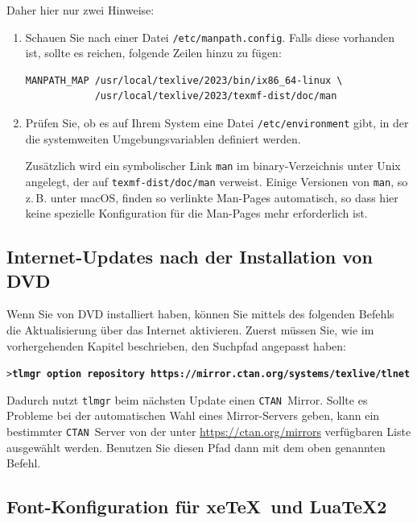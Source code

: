 \documentclass[12pt,ngerman,a4paper,fullparskip]{report}
\newcommand{\acro}[1]{\texttt{#1}}
\newcommand{\cmdname}[1]{\texttt{#1}}
\newcommand{\code}[1]{\texttt{#1}}
\newcommand{\filename}[1]{\texttt{#1}}
\newcommand{\dirname}[1]{\texttt{#1}}
\newcommand{\Ucom}[1]{\textbf{\texttt{#1}}}
\providecommand*{\CTAN}{\acro{CTAN}\xspace}
\providecommand*{\macOS}{macOS\xspace}
\begin{document}
Daher hier nur zwei Hinweise: 

\begin{enumerate}
\item Schauen Sie nach einer Datei
\filename{/etc/manpath.config}. Falls diese vorhanden ist, sollte es reichen, folgende Zeilen
hinzu zu fügen:

\begin{verbatim}
MANPATH_MAP /usr/local/texlive/2023/bin/ix86_64-linux \
            /usr/local/texlive/2023/texmf-dist/doc/man
\end{verbatim}

\item Prüfen Sie, ob es auf Ihrem System eine Datei \filename{/etc/environment} gibt, in der die
systemweiten Umgebungsvariablen definiert werden.

Zusätzlich wird ein symbolischer Link \code{man} im binary-Verzeichnis unter
Unix angelegt, der auf \dirname{texmf-dist/doc/man} verweist. Einige Versionen von \code{man}, so z.\,B. unter \macOS, finden so verlinkte Man-Pages automatisch, so dass hier keine spezielle
Konfiguration für die Man-Pages mehr erforderlich ist.

\end{enumerate}

\subsection{Internet-Updates nach der Installation von DVD}
\label{sec:dvd-install-net-updates}


Wenn Sie von DVD installiert haben, können Sie mittels des folgenden Befehls die Aktualisierung über das Internet aktivieren. Zuerst müssen Sie, wie im vorhergehenden Kapitel beschrieben, den Suchpfad angepasst haben:

\begin{alltt}
> \Ucom{tlmgr option repository https://mirror.ctan.org/systems/texlive/tlnet}
\end{alltt}

\noindent Dadurch nutzt \cmdname{tlmgr} beim nächsten Update einen \CTAN\ Mirror. Sollte es Probleme bei der automatischen Wahl eines Mirror-Servers geben, kann ein bestimmter \CTAN\ Server von der unter \url{https://ctan.org/mirrors} verfügbaren Liste ausgewählt werden. Benutzen Sie diesen Pfad dann mit dem oben genannten Befehl.

\subsection{Font-Konfiguration für xe\TeX\ und Lua\TeX2}\label{sec:font-conf-xetex}
\end{document}
